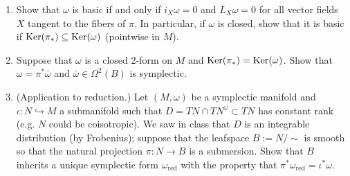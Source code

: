 \begin{exercise}
\label{exercise-basic-form}
\begin{enumerate}
\item Show that $\omega$ is basic if and only
if
$i_X \omega=0$ and $L_X\omega=0$
for all vector fields $X$ tangent
to the fibers of $\pi$.
In particular, if $\omega$ is closed,
show that it is basic if
\(\mathop{\mathrm{Ker}}(\pi_*) \subseteq \mathop{\mathrm{Ker}}(\omega)\)
(pointwise in $M$).

\item
\label{item-reduction-form}
Suppose that $\omega$ is a closed
2-form on $M$ and
\(\mathop{\mathrm{Ker}}(\pi_*)=\mathop{\mathrm{Ker}}(\omega)\).
Show that $\omega=\pi^*\overline{\omega}$
and \(\overline{\omega}\in\Omega^2(B)\)
is symplectic.

\item (Application to reduction.)
Let $(M,\omega)$ be a symplectic
manifold and 
$\iota:N\hookrightarrow M$
a submanifold such that
$D=TN \cap TN^\omega \subset TN$
has constant rank
(e.g. $N$ could be coisotropic).
We saw in class that $D$ is an
integrable distribution
(by Frobenius);
suppose that the leafspace
$B:=N/\sim$ is smooth so that the
natural projection
$\pi:N \to B$ is a submersion.
Show that $B$ inherits a unique symplectic
form $\omega_{\text{red}}$
with the property that
$\pi^*\omega_{\text{red}}=\iota^*\omega$.
\end{enumerate}
\end{exercise}

